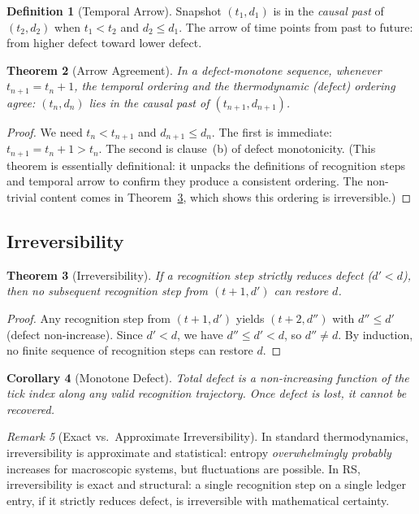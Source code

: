 \documentclass[12pt,a4paper]{article}
\newtheorem{theorem}{Theorem}[section]
\newtheorem{corollary}[theorem]{Corollary}
\theoremstyle{definition}
\newtheorem{definition}[theorem]{Definition}
\theoremstyle{remark}
\newtheorem{remark}[theorem]{Remark}
\begin{document}
\begin{definition}[Temporal Arrow]
\label{def:arrow}
Snapshot $(t_1, d_1)$ is in the \emph{causal past} of $(t_2, d_2)$ when
$t_1 < t_2$ and $d_2 \leq d_1$.  The arrow of time points from past to
future: from higher defect toward lower defect.
\end{definition}

\begin{theorem}[Arrow Agreement]
\label{thm:arrow-agree}
In a defect-monotone sequence, whenever $t_{n+1} = t_n + 1$, the
temporal ordering and the thermodynamic (defect) ordering agree:
$(t_n, d_n)$ lies in the causal past of $(t_{n+1}, d_{n+1})$.
\end{theorem}

\begin{proof}
We need $t_n < t_{n+1}$ and $d_{n+1} \leq d_n$.  The first is
immediate: $t_{n+1} = t_n + 1 > t_n$.  The second is clause~(b) of
defect monotonicity.  (This theorem is essentially definitional:
it unpacks the definitions of recognition steps and temporal arrow to
confirm they produce a consistent ordering.  The non-trivial content
comes in Theorem~\ref{thm:irrev}, which shows this ordering is
irreversible.)
\end{proof}

\subsection{Irreversibility}

\begin{theorem}[Irreversibility]
\label{thm:irrev}
If a recognition step strictly reduces defect ($d' < d$), then no
subsequent recognition step from $(t{+}1, d')$ can restore $d$.
\end{theorem}

\begin{proof}
Any recognition step from $(t{+}1, d')$ yields $(t{+}2, d'')$ with
$d'' \leq d'$ (defect non-increase).  Since $d' < d$, we have
$d'' \leq d' < d$, so $d'' \neq d$.  By induction, no finite sequence
of recognition steps can restore $d$.
\end{proof}

\begin{corollary}[Monotone Defect]
\label{cor:mono}
Total defect is a non-increasing function of the tick index along any
valid recognition trajectory.  Once defect is lost, it cannot be
recovered.
\end{corollary}

\begin{remark}[Exact vs.\ Approximate Irreversibility]
In standard thermodynamics, irreversibility is approximate and
statistical: entropy \emph{overwhelmingly probably} increases for
macroscopic systems, but fluctuations are possible.  In RS,
irreversibility is exact and structural: a single recognition step on a
single ledger entry, if it strictly reduces defect, is irreversible with
mathematical certainty.
\end{remark}
\end{document}
